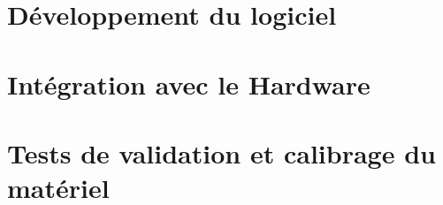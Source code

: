 \section{Développement du logiciel}
\section{Intégration avec le Hardware}
\section{Tests de validation et calibrage du matériel}
